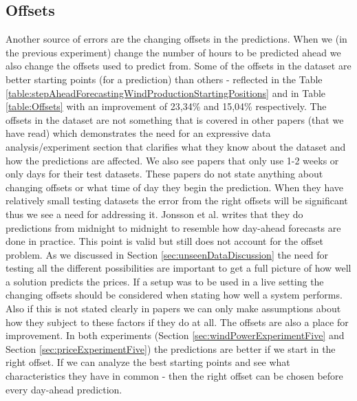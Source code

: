 \subsection{Offsets}
\label{sec:offsetsDiscussion}
Another source of errors are the changing offsets in the predictions. When we (in the previous experiment) change the number of hours to be predicted ahead we also change the offsets used to predict from. Some of the offsets in the dataset are better starting points (for a prediction) than others - reflected in the Table \ref{table:stepAheadForecastingWindProductionStartingPositions} and in Table \ref{table:Offsets} with an improvement of 23,34\% and 15,04\% respectively. The offsets in the dataset are not something that is covered in other papers (that we have read) which demonstrates the need for an expressive data analysis/experiment section that clarifies what they know about the dataset and how the predictions are affected. We also see papers that only use 1-2 weeks\cite{yamin2004adaptive} or only days \cite{1, singhal2011electricity, pjmForecast} for their test datasets. These papers do not state anything about changing offsets or what time of day they begin the prediction. When they have relatively small testing datasets the error from the right offsets will be significant thus we see a need for addressing it. Jonsson et al.\cite{forecastingSpotPricesAccountingForWindPower} writes that they do predictions from midnight to midnight to resemble how day-ahead forecasts are done in practice. This point is valid but still does not account for the offset problem. As we discussed in Section \ref{sec:unseenDataDiscussion} the need for testing all the different possibilities are important to get a full picture of how well a solution predicts the prices. If a setup was to be used in a live setting the changing offsets should be considered when stating how well a system performs. Also if this is not stated clearly in papers we can only make assumptions about how they subject to these factors if they do at all. The offsets are also a place for improvement. In both experiments (Section \ref{sec:windPowerExperimentFive} and Section \ref{sec:priceExperimentFive}) the predictions are better if we start in the right offset. If we can analyze the best starting points and see what characteristics they have in common - then the right offset can be chosen before every day-ahead prediction.